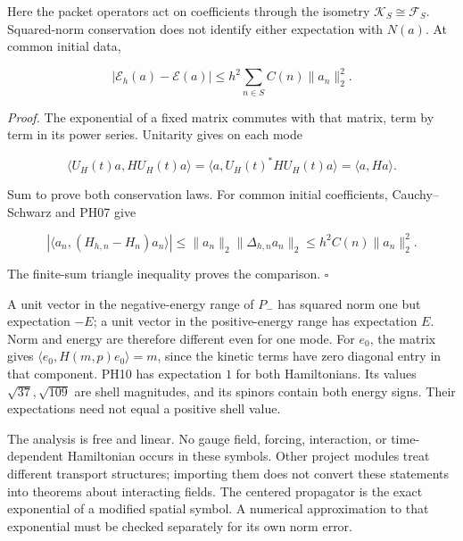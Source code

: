 Here the packet operators act on coefficients through the isometry
\(\mathcal K_S\cong\mathcal F_S\). Squared-norm conservation does not
identify either expectation with \(N(a)\). At common initial data,

\[
|\mathcal E_h(a)-\mathcal E(a)|
\le h^2\sum_{n\in S}C(n)\|a_n\|_2^2.
\]

\emph{Proof.} The exponential of a fixed matrix commutes with that
matrix, term by term in its power series. Unitarity gives on each mode

\[
\langle U_H(t)a,H U_H(t)a\rangle
=\langle a,U_H(t)^*HU_H(t)a\rangle
=\langle a,Ha\rangle.
\]

Sum to prove both conservation laws. For common initial coefficients,
Cauchy--Schwarz and PH07 give

\[
|\langle a_n,(H_{h,n}-H_n)a_n\rangle|
\le\|a_n\|_2\|\Delta_{h,n}a_n\|_2
\le h^2C(n)\|a_n\|_2^2.
\]

The finite-sum triangle inequality proves the comparison. \(\square\)

A unit vector in the negative-energy range of \(P_-\) has squared norm
one but expectation \(-E\); a unit vector in the positive-energy range
has expectation \(E\). Norm and energy are therefore different even for
one mode. For \(e_0\), the matrix gives
\(\langle e_0,H(m,p)e_0\rangle=m\), since the kinetic terms have zero
diagonal entry in that component. PH10 has expectation \(1\) for both
Hamiltonians. Its values \(\sqrt{37},\sqrt{109}\) are shell magnitudes,
and its spinors contain both energy signs. Their expectations need not
equal a positive shell value.

The analysis is free and linear. No gauge field, forcing, interaction,
or time-dependent Hamiltonian occurs in these symbols. Other project
modules treat different transport structures; importing them does not
convert these statements into theorems about interacting fields. The
centered propagator is the exact exponential of a modified spatial
symbol. A numerical approximation to that exponential must be checked separately
for its own norm error.

